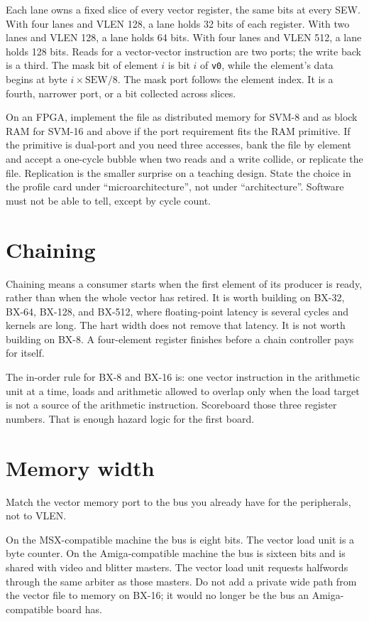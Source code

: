 Each lane owns a fixed slice of every vector register, the same bits at every SEW. With four lanes and VLEN 128, a lane holds 32 bits of each register. With two lanes and VLEN 128, a lane holds 64 bits. With four lanes and VLEN 512, a lane holds 128 bits. Reads for a vector-vector instruction are two ports; the write back is a third. The mask bit of element $i$ is bit $i$ of \texttt{v0}, while the element's data begins at byte $i \times \mathrm{SEW}/8$. The mask port follows the element index. It is a fourth, narrower port, or a bit collected across slices.

On an FPGA, implement the file as distributed memory for SVM-8 and as block RAM for SVM-16 and above if the port requirement fits the RAM primitive. If the primitive is dual-port and you need three accesses, bank the file by element and accept a one-cycle bubble when two reads and a write collide, or replicate the file. Replication is the smaller surprise on a teaching design. State the choice in the profile card under ``microarchitecture'', not under ``architecture''. Software must not be able to tell, except by cycle count.

\section{Chaining}

Chaining means a consumer starts when the first element of its producer is ready, rather than when the whole vector has retired. It is worth building on BX-32, BX-64, BX-128, and BX-512, where floating-point latency is several cycles and kernels are long. The hart width does not remove that latency. It is not worth building on BX-8. A four-element register finishes before a chain controller pays for itself.

The in-order rule for BX-8 and BX-16 is: one vector instruction in the arithmetic unit at a time, loads and arithmetic allowed to overlap only when the load target is not a source of the arithmetic instruction. Scoreboard those three register numbers. That is enough hazard logic for the first board.

\section{Memory width}

Match the vector memory port to the bus you already have for the peripherals, not to VLEN.

On the MSX-compatible machine the bus is eight bits. The vector load unit is a byte counter. On the Amiga-compatible machine the bus is sixteen bits and is shared with video and blitter masters. The vector load unit requests halfwords through the same arbiter as those masters. Do not add a private wide path from the vector file to memory on BX-16; it would no longer be the bus an Amiga-compatible board has.

